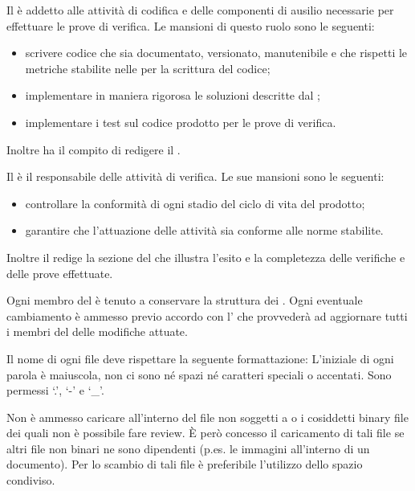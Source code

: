 \documentclass[a4paper, titlepage]{article}
\begin{document}
Il  è addetto alle attività di codifica e delle componenti di ausilio necessarie per effettuare le prove di verifica. Le mansioni di questo ruolo sono le seguenti:
\begin{itemize}
	\item scrivere codice che sia documentato, versionato, manutenibile e che rispetti le metriche stabilite nelle  per la scrittura del codice;
	\item implementare in maniera rigorosa le soluzioni descritte dal ;
	\item implementare i test sul codice prodotto per le prove di verifica.
\end{itemize}
Inoltre ha il compito di redigere il .

Il  è il responsabile delle attività di verifica. Le sue mansioni sono le seguenti:
\begin{itemize}
	\item controllare la conformità di ogni stadio del ciclo di vita del prodotto;
	\item garantire che l'attuazione delle attività sia conforme alle norme stabilite.
\end{itemize}
Inoltre il  redige la sezione del  che illustra l'esito e la completezza delle verifiche e delle prove effettuate.

Ogni membro del  è tenuto a conservare la struttura dei . Ogni eventuale cambiamento è ammesso previo accordo con l' che provvederà ad aggiornare tutti i membri del  delle modifiche attuate.

Il nome di ogni file deve rispettare la seguente formattazione:
L'iniziale di ogni parola è maiuscola, non ci sono né spazi né caratteri speciali o accentati. Sono permessi `.', `-' e `\_'.

Non è ammesso caricare all'interno del  file non soggetti a  o i cosiddetti binary file dei quali non è possibile fare review. È però concesso il caricamento di tali file se altri file non binari ne sono dipendenti (p.es. le immagini all'interno di un documento). Per lo scambio di tali file è preferibile l'utilizzo dello spazio  condiviso.
\end{document}
